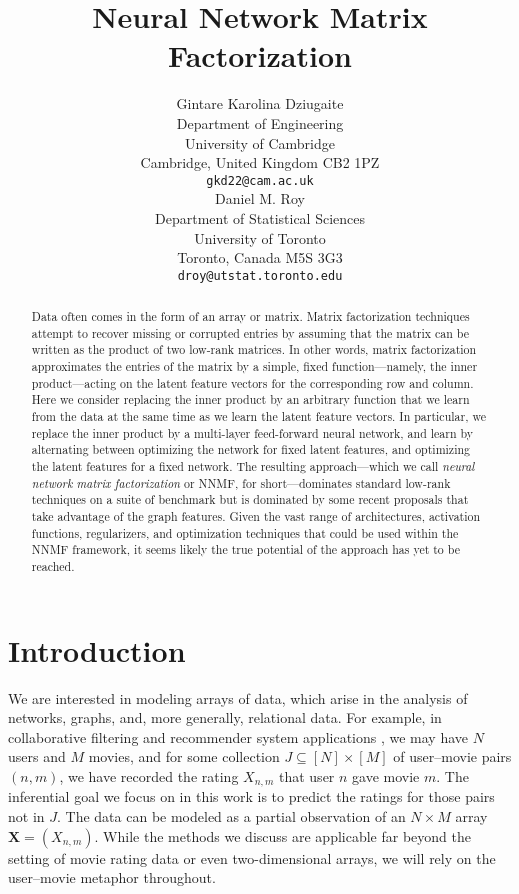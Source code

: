 \documentclass{article} \usepackage{iclr2016_conference,times}
\title{Neural Network Matrix Factorization}
\author{Gintare Karolina Dziugaite \\
Department of Engineering \\
University of Cambridge\\
Cambridge, United Kingdom CB2 1PZ \\
\texttt{gkd22@cam.ac.uk} \\
\And
Daniel M. Roy \\
Department of Statistical Sciences \\
University of Toronto\\
Toronto, Canada M5S 3G3\\
\texttt{droy@utstat.toronto.edu}
}
\begin{document}
 





\maketitle

\begin{abstract}
Data often comes in the form of an array or matrix.  Matrix factorization techniques attempt to recover missing or corrupted entries by assuming that the matrix can be written as the product of two low-rank matrices.  In other words, matrix factorization approximates the entries of the matrix by a simple, fixed function---namely, the inner product---acting on the latent feature vectors for the corresponding row and column.  Here we consider replacing the inner product by an arbitrary function that we learn from the data at the same time as we learn the latent feature vectors.  In particular, we replace the inner product by a multi-layer feed-forward neural network, and learn by alternating between optimizing the network for fixed latent features, and optimizing the latent features for a fixed network.  
The resulting approach---which we call \emph{neural network matrix factorization} or NNMF, for short---dominates standard low-rank techniques on a suite of benchmark but is dominated by some recent proposals that take advantage of the graph features.
Given the vast range of architectures, activation functions, regularizers, and optimization techniques that could be used within the NNMF framework, it seems likely the true potential of the approach has yet to be reached.
\end{abstract}






\section{Introduction}

We are interested in modeling arrays of data, which arise in the analysis of networks, graphs, and, more generally, relational data.  
For example,
in collaborative filtering and recommender system applications \citep{GNOT92,BiasedMF}, we may have $N$ users and $M$ movies, and for some collection $J \subseteq [N] \times [M]$ of user--movie pairs $(n,m)$, we have recorded the rating $X_{n,m}$ that user $n$ gave movie $m$.  The inferential goal we focus on in this work is to predict the ratings for those pairs not in $J$.  The data can be modeled as a partial observation of an $N \times M$ array $\bm X=(X_{n,m})$.  
While the methods we discuss are applicable far beyond the setting of movie rating data or even two-dimensional arrays, we will rely on the user--movie metaphor throughout.
\end{document}
